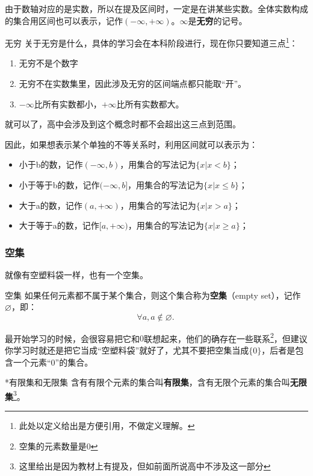 由于数轴对应的是实数，所以在提及区间时，一定是在讲某些实数。全体实数构成的集合用区间也可以表示，记作$(-\infty,+\infty)$。$\infty$是\textbf{无穷}的记号。
\begin{definition}{无穷}
关于无穷是什么，具体的学习会在本科阶段进行，现在你只要知道三点\footnote{此处以定义给出是方便引用，不做定义理解。}：
\begin{enumerate}
\item 无穷不是个数字
\item 无穷不在实数集里，因此涉及无穷的区间端点都只能取“开”。
\item $-\infty$比所有实数都小，$+\infty$比所有实数都大。
\end{enumerate}
就可以了，高中会涉及到这个概念时都不会超出这三点到范围。
\end{definition}

因此，如果想表示某个单独的不等关系时，利用区间就可以表示为：
\begin{itemize}
\item 小于b的数，记作$(-\infty,b)$，用集合的写法记为$\{x|x< b\}$；
\item 小于等于b的数，记作$(-\infty,b]$，用集合的写法记为$\{x|x\leq b\}$；
\item 大于a的数，记作$(a,+\infty)$，用集合的写法记为$\{x|x> a\}$；
\item 大于等于a的数，记作$[a,+\infty)$，用集合的写法记为$\{x|x\geq a\}$；
\end{itemize}

\subsubsection{空集}

就像有空塑料袋一样，也有一个空集。

\begin{definition}{空集}
如果任何元素都不属于某个集合，则这个集合称为\textbf{空集}（empty set），记作 $\varnothing$，即：
\begin{equation}
\forall a,a\notin\varnothing.~
\end{equation}
\end{definition}

最开始学习的时候，会很容易把它和$0$联想起来，他们的确存在一些联系\footnote{空集的元素数量是0}，但建议你学习时就还是把它当成“空塑料袋”就好了，尤其不要把空集当成$\{0\}$，后者是包含一个元素“$0$”的集合。

\begin{definition}{*有限集和无限集}
含有有限个元素的集合叫\textbf{有限集}，含有无限个元素的集合叫\textbf{无限集}\footnote{这里给出是因为教材上有提及，但如前面所说高中不涉及这一部分}。
\end{definition}

